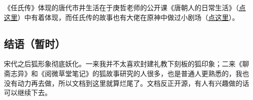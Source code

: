 \documentclass[UTF8, 12pt, A4paper]{article}
\begin{document}
《任氏传》体现的唐代市井生活在于庚哲老师的公开课《唐朝人的日常生活》（\href{https://www.bilibili.com/video/BV1Ys411i7TX?from=search&seid=3542674334035946237&spm_id_from=333.337.0.0}{点这里}）中有着体现，而任氏传的故事也有大佬在原神中做过小剧场（\href{https://www.bilibili.com/video/BV1J3411x7ES?from=search&seid=17139983702031625699&spm_id_from=333.337.0.0}{点这里}）。   


\subsection{结语（暂时）}

宋代之后狐形象彻底妖化。一来我并不太喜欢封建礼教下刻板的狐印象；二来《聊斋志异》和《阅微草堂笔记》的狐故事研究的人很多，也是普通人更熟悉的，我也没有动力再去做，所以文档到这里就算烂尾了。文档反正开源，有人有兴趣做的话可以继续下去。
\end{document}
